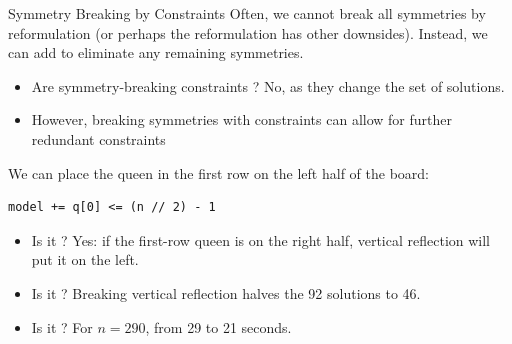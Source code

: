\documentclass{cons-beamer}
\newcommand{\nqueens}[1]{
  \chessboard[
    style=nqueens,
    setblack={#1},
  ]
}
\newcommand{\nqueensProblem}{\problemClass{NQueens}}
\begin{document}
\begin{frame}[fragile]{Symmetry Breaking by Constraints}
  Often, we cannot break all symmetries by reformulation (or perhaps the reformulation has other downsides).
  Instead, we can add  to eliminate any remaining symmetries.

  \begin{itemize}
    \item Are symmetry-breaking constraints ? \pause \alert{No, as they change the set of solutions.}
    \item However, breaking symmetries with constraints can allow for further redundant constraints
  \end{itemize}

\end{frame}
\begin{frame}[fragile]

  \begin{example}[\nqueensProblem]

    \begin{center}
      \nqueens{Qa8,Qe7,Qh6,Qf5,Qc4,Qg3,Qb2,Qd1}
      \nqueens{Qh8,Qd7,Qa6,Qc5,Qf4,Qb3,Qg2,Qe1}
    \end{center}

    \pause
    We can place the queen in the first row on the left half of the board:
    \pause

    \begin{lstlisting}[language=cpmpy,numbers=none]
model += q[0] <= (n // 2) - 1\end{lstlisting}
    \begin{itemize}
      \item Is it ? \pause Yes: if the first-row queen is on the right half, vertical reflection will put it on the left.
      \item Is it ? \pause Breaking vertical reflection halves the 92 solutions to 46.
      \item Is it ? \pause For $n=290$, from 29 to 21 seconds.
    \end{itemize}
  \end{example}

\end{frame}
\end{document}
